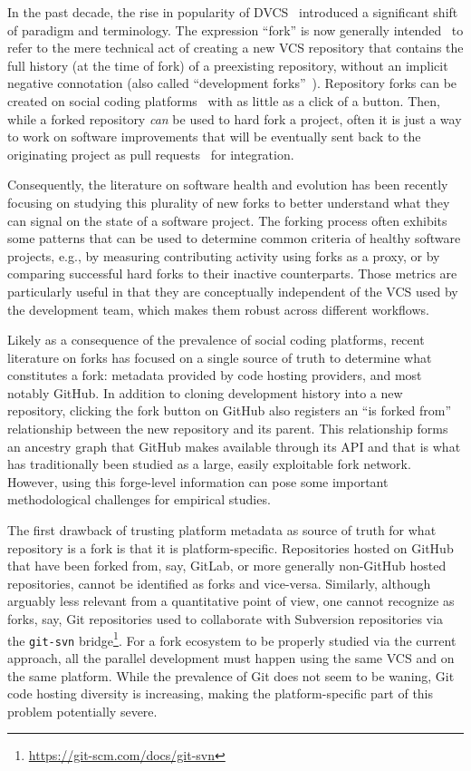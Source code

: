 In the past decade, the rise in popularity of
\gls{DVCS}~\cite{spinellis2005vcs} introduced a significant shift of paradigm
and terminology. The expression ``fork'' is now generally
intended~\cite{zhou2019fork} to refer to the mere technical act of creating a
new \gls{VCS} repository that contains the full history (at the time of fork)
of a preexisting repository, without an implicit negative connotation (also
called ``development forks''~\cite{fogel2005producingoss}). Repository forks
can be created on social coding platforms~\cite{dabbish2012socialcoding,
thung2013network} with as little as a click of a button. Then, while a forked
repository \emph{can} be used to hard fork a project, often it is just a way to
work on software improvements that will be eventually sent back to the
originating project as pull requests~\cite{gousios2014pullrequests} for
integration.

Consequently, the literature on software health and evolution has been
recently focusing on studying this plurality of new forks to better
understand what they can signal on the state of a software project. The
forking process often exhibits some patterns that can be used to determine
common criteria of healthy software projects, e.g., by measuring contributing
activity using forks as a proxy, or by comparing successful hard forks to
their inactive counterparts. Those metrics are particularly useful in that
they are conceptually independent of the \gls{VCS} used by the development
team, which makes them robust across different workflows.

Likely as a consequence of the prevalence of social coding platforms, recent
literature on forks has focused on a single source of truth to determine what
constitutes a fork: metadata provided by code hosting providers, and most
notably GitHub. In addition to cloning development history into a new
repository, clicking the fork button on GitHub also registers an ``is forked
from'' relationship between the new repository and its parent. This
relationship forms an ancestry graph that GitHub makes available through its
API and that is what has traditionally been studied as a large, easily
exploitable fork network. However, using this forge-level information can pose
some important methodological challenges for empirical studies.

The first drawback of trusting platform metadata as source of truth for what
repository is a fork is that it is platform-specific.  Repositories hosted on
GitHub that have been forked from, say, GitLab, or more generally non-GitHub
hosted repositories, cannot be identified as forks and vice-versa. Similarly,
although arguably less relevant from a quantitative point of view, one cannot
recognize as forks, say, Git repositories used to collaborate with Subversion
repositories via the \texttt{git-svn}
bridge\footnote{\url{https://git-scm.com/docs/git-svn}}. For a fork ecosystem
to be properly studied via the current approach, all the parallel development
must happen using the same \gls{VCS} and on the same platform. While the
prevalence of Git does not seem to be waning, Git code hosting diversity is
increasing, making the platform-specific part of this problem potentially
severe.

